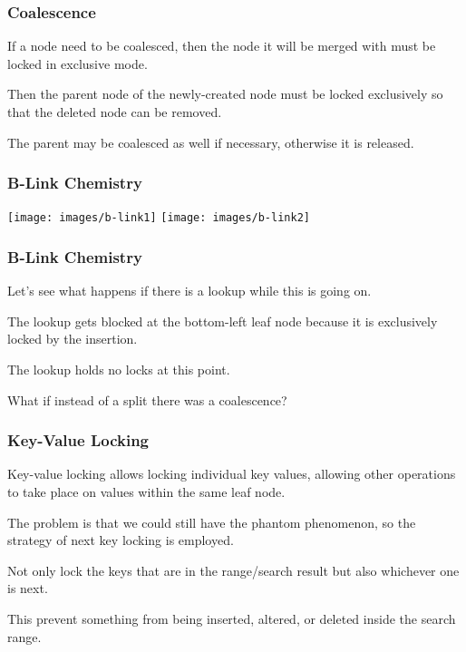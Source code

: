 \begin{frame}
\frametitle{Coalescence}

If a node need to be coalesced, then the node it will be merged with must be locked in exclusive mode. 

Then the parent node of the newly-created node must be locked exclusively so that the deleted node can be removed. 

The parent may be coalesced as well if necessary, otherwise it is released.

\end{frame}

\begin{frame}
\frametitle{B-Link Chemistry}

\begin{center}
	\texttt{[image: images/b-link1]}
	\vspace{5em}
	\texttt{[image: images/b-link2]}
\end{center}


\end{frame}

\begin{frame}
\frametitle{B-Link Chemistry}

Let's see what happens if there is a lookup while this is going on.

The lookup gets blocked at the bottom-left leaf node because it is exclusively locked by the insertion. 

The lookup holds no locks at this point.

What if instead of a split there was a coalescence?

\end{frame}



\begin{frame}
\frametitle{Key-Value Locking}

Key-value locking allows locking individual key values, allowing other operations to take place on values within the same leaf node.

The problem is that we could still have the phantom phenomenon, so the strategy of \alert{next key locking} is employed. 

Not only lock the keys that are in the range/search result but also whichever one is next. 

This prevent something from being inserted, altered, or deleted inside the search range. 


\end{frame}












